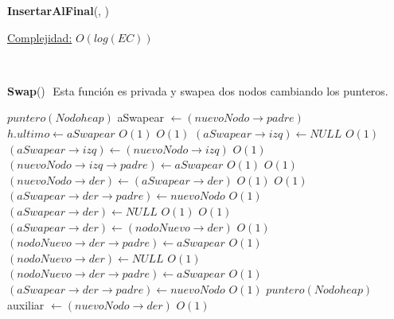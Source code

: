 \begin{Algoritmos}
\begin{algorithm}[H]{\textbf{InsertarAlFinal}(, )}
\begin{algorithmic}[1]
			\medskip
			\Statex \underline{Complejidad:} $O(log(EC))$
    	\end{algorithmic}   	
\end{algorithm} $ $\newline
$ $\newline
$ $\newline
$ $\newline
$ $\newline
$ $\newline
$ $\newline
$ $\newline
$ $\newline
$ $\newline

{\textbf{Swap}()} $ $\newline
$ $\Comment Esta funci\'on es privada y swapea dos nodos cambiando los punteros.
    	\begin{algorithmic}[1]
    		\State $puntero(Nodoheap)$ aSwapear $\gets (nuevoNodo \rightarrow padre)$
    			\State $h.ultimo \gets aSwapear$
    		\EndIf
			 \Comment $O(1)$
						 \Comment $O(1)$
								\State $(aSwapear \rightarrow izq) \gets NULL$ \Comment $O(1)$
							\Else
								\State $(aSwapear \rightarrow izq) \gets (nuevoNodo \rightarrow izq)$ \Comment $O(1)$
								\State $(nuevoNodo \rightarrow izq \rightarrow padre) \gets aSwapear$ \Comment $O(1)$
							\EndIf
							 \Comment $O(1)$
								\State $(nuevoNodo \rightarrow der) \gets (aSwapear \rightarrow der)$ \Comment $O(1)$
								 \Comment $O(1)$
								\State $(aSwapear \rightarrow der \rightarrow padre) \gets nuevoNodo$	 \Comment $O(1)$						
								\EndIf
								\State $(aSwapear \rightarrow der) \gets NULL$ \Comment $O(1)$
							\Else
								 \Comment $O(1)$
									\State $(aSwapear \rightarrow der) \gets (nodoNuevo \rightarrow der)$ \Comment $O(1)$
									\State $(nodoNuevo \rightarrow der \rightarrow padre) \gets aSwapear$ \Comment $O(1)$
									\State $(nodoNuevo \rightarrow der) \gets NULL$ \Comment $O(1)$
								\Else
									\State $(nodoNuevo \rightarrow der \rightarrow padre) \gets aSwapear$ \Comment $O(1)$
									\State $(aSwapear \rightarrow der \rightarrow padre) \gets nuevoNodo$ \Comment $O(1)$
									\State $puntero(Nodoheap)$ auxiliar $\gets (nuevoNodo \rightarrow der)$ \Comment $O(1)$

\end{algorithmic}
\end{Algoritmos}
